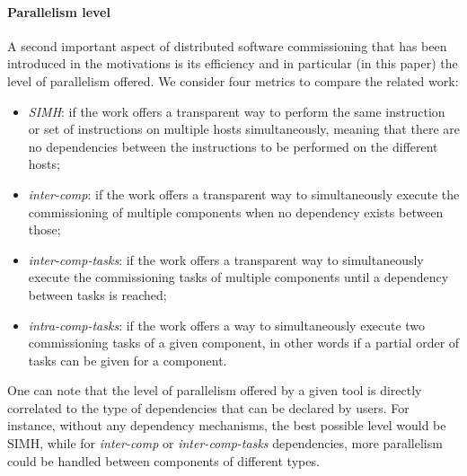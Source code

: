 \paragraph{Parallelism level}
A second important aspect of distributed software commissioning that has been introduced in the motivations is its efficiency and in particular (in this paper) the level of parallelism offered. We consider four metrics to compare the related work:
\begin{itemize}
	\item \emph{SIMH}: if the work offers a transparent way to perform the same instruction or set of instructions on multiple hosts simultaneously, meaning that there are no dependencies between the instructions to be performed on the different hosts;
	\item \emph{inter-comp}: if the work offers a transparent way to simultaneously execute the commissioning of multiple components when no dependency exists between those;
  \item \emph{inter-comp-tasks}: if the work offers a transparent way to     simultaneously execute the commissioning tasks of multiple components until a dependency between tasks is reached;
  \item \emph{intra-comp-tasks}: if the work offers a way to simultaneously    execute two commissioning tasks of a given component, in other words if a partial order of tasks can be given for a component.
\end{itemize}
One can note that the level of parallelism offered by a given tool is directly correlated to the type of dependencies that can be declared by users. For instance, without any dependency mechanisms, the best possible level would be SIMH, while for \emph{inter-comp} or \emph{inter-comp-tasks} dependencies, more parallelism could be handled between components of different types.

